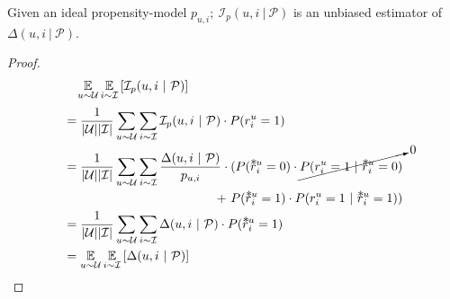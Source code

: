 \begin{proposition}
Given an ideal propensity-model $p_{u, i}; \ \mathcal{I}_p(u, i ~|~ \mathcal{P})$ is an unbiased estimator of $\Delta(u, i ~|~ \mathcal{P})$.
\end{proposition}

\begin{proof}
\begin{align*}
    \EE_{u \sim \mathcal{U}} \EE_{i \sim \mathcal{I}} \left[ \mathcal{I}_p(u, i ~|~ \mathcal{P}) \right] \hspace{5.65cm}
\end{align*}
\vspace{-0.4cm}
\begin{align*}
    &= \frac{1}{|\mathcal{U}| |\mathcal{I}|} \sum_{u \sim \mathcal{U}} \sum_{i \sim \mathcal{I}} \mathcal{I}_p(u, i ~|~ \mathcal{P}) \cdot P(r_i^u = 1) \\
    &= \begin{aligned}[t]
        \frac{1}{|\mathcal{U}| |\mathcal{I}|} \sum_{u \sim \mathcal{U}} \sum_{i \sim \mathcal{I}} \frac{\Delta(u, i ~|~ \mathcal{P})}{p_{u, i}} \cdot ( P(\overstar{r}_i^u = 0) \cdot \cancelto{0}{P(r_i^u = 1 ~|~ \overstar{r}_i^u = 0)} \\
        +~ P(\overstar{r}_i^u = 1) \cdot P(r_i^u = 1 ~|~ \overstar{r}_i^u = 1)) \\ %
    \end{aligned} \\
    &= \frac{1}{|\mathcal{U}| |\mathcal{I}|} \sum_{u \sim \mathcal{U}} \sum_{i \sim \mathcal{I}} \Delta(u, i ~|~ \mathcal{P}) \cdot P(\overstar{r}_i^u = 1) \\ %
    &= \EE_{u \sim \mathcal{U}} \EE_{i \sim \mathcal{I}} \left[ \Delta(u, i ~|~ \mathcal{P}) \right] \qedhere
\end{align*}
\end{proof}
